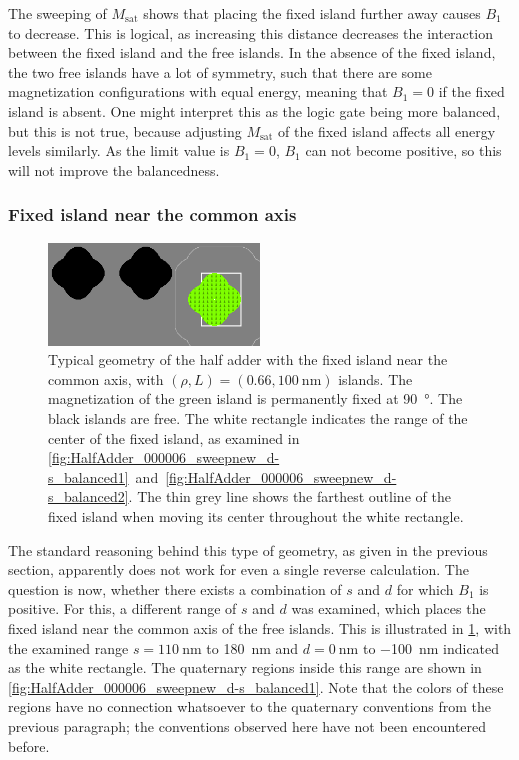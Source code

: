 \documentclass[11pt,a4paper,english]{article}
\begin{document}
The sweeping of $M_\mathrm{sat}$ shows that placing the fixed island further away causes $B_1$ to decrease. This is logical, as increasing this distance decreases the interaction between the fixed island and the free islands. In the absence of the fixed island, the two free islands have a lot of symmetry, such that there are some magnetization configurations with equal energy, meaning that $B_1=0$ if the fixed island is absent. One might interpret this as the logic gate being more balanced, but this is not true,
because adjusting $M_\mathrm{sat}$ of the fixed island affects all energy levels similarly. As the limit value is $B_1=0$, $B_1$ can not become positive, so this will not improve the balancedness.

\subsubsection{Fixed island near the common axis}
\begin{figure}[b!]
    \centering
    \includegraphics[width=0.5\textwidth]{Figures/half_adder/regions000014.png} %
    \caption{Typical geometry of the half adder with the fixed island near the common axis, with $(\rho, L) = (0.66, \SI{100}{\nano\metre})$ islands. The magnetization of the green island is permanently fixed at \SI{90}{\degree}. The black islands are free. The white rectangle indicates the range of the center of the fixed island, as examined in \cref{fig:HalfAdder_000006_sweepnew_d-s_balanced1}~and~\ref{fig:HalfAdder_000006_sweepnew_d-s_balanced2}. The thin grey line shows the farthest outline of the fixed island when moving its center throughout the white rectangle.}
    \label{fig:HalfAdder_000006new_geometryTypical}
\end{figure}
The standard reasoning behind this type of geometry, as given in the previous section, apparently does not work for even a single reverse calculation. The question is now, whether there exists a combination of $s$ and $d$ for which $B_1$ is positive. For this, a different range of $s$ and $d$ was examined, which places the fixed island near the common axis of the free islands. This is illustrated in \cref{fig:HalfAdder_000006new_geometryTypical}, with the examined range $s=\SI{110}{\nano\metre}$ to \SI{180}{\nano\metre} and $d=\SI{0}{\nano\metre}$ to \SI{-100}{\nano\metre} indicated as the white rectangle. The quaternary regions inside this range are shown in \cref{fig:HalfAdder_000006_sweepnew_d-s_balanced1}. Note that the colors of these regions have no connection whatsoever to the quaternary conventions from the previous paragraph; the conventions observed here have not been encountered before. \par
\end{document}
